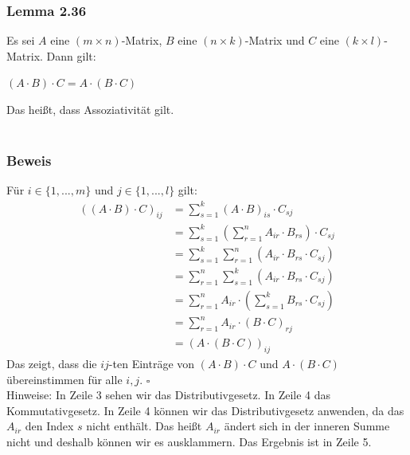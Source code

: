 \documentclass{article}
\begin{document}
\subsubsection*{Lemma 2.36}
Es sei $A$ eine $(m \times n)$-Matrix, $B$ eine $(n \times k)$-Matrix und $C$ eine $(k \times l)$-Matrix. Dann gilt: \\
\begin{center}
    $(A \cdot B) \cdot C = A \cdot (B \cdot C)$
\end{center}
Das heißt, dass Assoziativität gilt. \\
\\
\subsubsection*{Beweis}
Für $i \in \{1, ..., m\}$ und $j \in \{1, ..., l\}$ gilt: \\

\begin{align*}
    ((A \cdot B) \cdot C)_{ij} &= \displaystyle\sum_{s=1}^k (A \cdot B)_{is} \cdot C_{sj} \\
    &= \displaystyle\sum_{s=1}^k \left( \displaystyle\sum_{r=1}^n A_{ir} \cdot B_{rs} \right) \cdot C_{sj} \\
    &= \displaystyle\sum_{s=1}^k \displaystyle\sum_{r=1}^n \left(A_{ir} \cdot B_{rs} \cdot C_{sj}\right) \\
    &= \displaystyle\sum_{r=1}^n \displaystyle\sum_{s=1}^k \left(A_{ir} \cdot B_{rs} \cdot C_{sj}\right) \\
    &= \displaystyle\sum_{r=1}^n A_{ir} \cdot \left( \displaystyle\sum_{s=1}^k B_{rs} \cdot C_{sj} \right) \\
    &= \displaystyle\sum_{r=1}^n A_{ir} \cdot (B \cdot C)_{rj} \\
    &= (A \cdot (B \cdot C))_{ij}
\end{align*}
Das zeigt, dass die $ij$-ten Einträge von $(A \cdot B) \cdot C$ und $A \cdot (B \cdot C)$ übereinstimmen für alle $i,j$. $\square$ \\
Hinweise: In Zeile 3 sehen wir das Distributivgesetz. In Zeile 4 das Kommutativgesetz. In Zeile 4 können wir das Distributivgesetz anwenden, da das $A_{ir}$ den Index $s$ nicht enthält. Das heißt $A_{ir}$ ändert sich in der inneren Summe nicht und deshalb können wir es ausklammern. Das Ergebnis ist in Zeile 5. \\
\\
\end{document}
